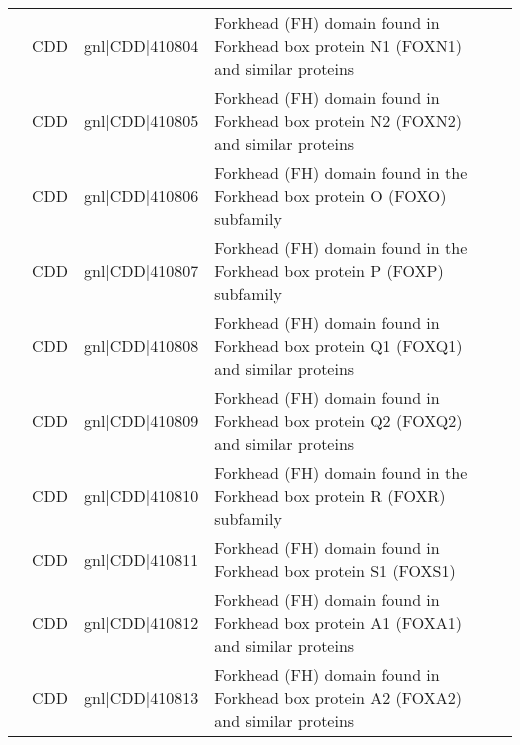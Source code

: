 \documentclass[../main.tex]{subfiles}
\begin{document}
\begin{landscape}
\begin{longtable}{@{}cllll@{}}
		                                & CDD                  & gnl|CDD|410804  & Forkhead (FH) domain found in Forkhead box protein N1 (FOXN1) and similar proteins                                                           & \\
		                                & CDD                  & gnl|CDD|410805  & Forkhead (FH) domain found in Forkhead box protein N2 (FOXN2) and similar proteins                                                           & \\
		                                & CDD                  & gnl|CDD|410806  & Forkhead (FH) domain found in the Forkhead box protein O (FOXO) subfamily                                                                    & \\
		                                & CDD                  & gnl|CDD|410807  & Forkhead (FH) domain found in the Forkhead box protein P (FOXP) subfamily                                                                    & \\
		                                & CDD                  & gnl|CDD|410808  & Forkhead (FH) domain found in Forkhead box protein Q1 (FOXQ1) and similar proteins                                                           & \\
		                                & CDD                  & gnl|CDD|410809  & Forkhead (FH) domain found in Forkhead box protein Q2 (FOXQ2) and similar proteins                                                           & \\
		                                & CDD                  & gnl|CDD|410810  & Forkhead (FH) domain found in the Forkhead box protein R (FOXR) subfamily                                                                    & \\
		                                & CDD                  & gnl|CDD|410811  & Forkhead (FH) domain found in Forkhead box protein S1 (FOXS1)                                                                                & \\
		                                & CDD                  & gnl|CDD|410812  & Forkhead (FH) domain found in Forkhead box protein A1 (FOXA1) and similar proteins                                                           & \\
		                                & CDD                  & gnl|CDD|410813  & Forkhead (FH) domain found in Forkhead box protein A2 (FOXA2) and similar proteins                                                           & \\

\end{longtable}
\end{landscape}
\end{document}
